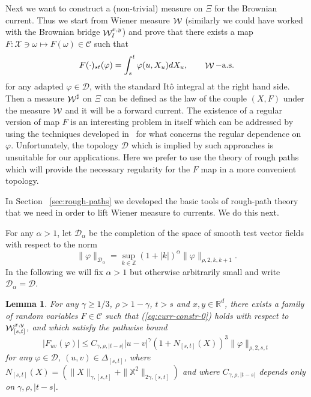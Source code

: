 \documentclass[a4paper,11pt]{article}
\newtheorem{lemma}[theorem]{Lemma}
\newcommand{\R}{\mathbb{R}}
\newcommand {\C}  {\ensuremath {\mathcal{C}}}
\newcommand {\D}  {\ensuremath {\mathcal{D}}}
\newcommand{\W}{\mathop{\mathrm{{\cal W}}}\nolimits}
\newcommand{\X}{\mathcal{X}}
\newcommand {\Z} {\mathbb{Z}}
\begin{document}
Next we want to construct a (non-trivial) measure on $\Xi$ for the
Brownian current. Thus we start from Wiener measure $\W$ (similarly 
we could have worked with the Brownian bridge $\W_I^{x,y}$) and prove 
that there exists a map $F: \X \ni \omega \mapsto F(\omega)\in\C$ such
 that
\begin{equation}
  \label{eq:curr-constr-0-bis}
F(\cdot)_{st}(\varphi) = \int_s^t \varphi(u,X_u) dX_u, 
\qquad \W-\text{a.s.}  
\end{equation}
for any adapted $\varphi \in \D$, with the standard It\^o integral 
at the right hand side. Then a measure $\W^\sharp$ on $\Xi$ can be 
defined as the law of the couple $(X,F)$ under the measure $\W$ and 
it will be a forward current. The existence of a regular version of 
map $F$ is an interesting problem in itself which can be addressed 
by using the techniques developed in~\cite{FGGT, FGR} for what 
concerns the regular dependence on $\varphi$. Unfortunately, the 
topology $\D$ which is implied by such approaches is unsuitable for 
our applications. Here we prefer to use the theory of rough paths 
which will provide the necessary regularity for the $F$ map in a 
more convenient topology.

In Section ~\ref{sec:rough-paths} we developed the basic tools of
rough-path theory that we need in order to lift Wiener measure to 
currents. We do this next.

For any $\alpha > 1$, let $\D_\alpha$ be the completion of the space of 
smooth test vector fields with respect to the norm
$$
\|\varphi\|_{\D_\alpha} = \sup_{k \in \Z} (1+|k|)^\alpha 
\|\varphi\|_{\rho,2,k,k+1}.
$$ 
In the following we will fix $\alpha>1$ but otherwise arbitrarily small and 
write $\D_\alpha = \D$.
\begin{lemma}
\label{lemma:rough}
For any $\gamma \ge 1/3$, $\rho > 1-\gamma$, $t>s$ and $x,y\in \R^d$, 
there exists a family of random variables $F \in \C$ such that
(\ref{eq:curr-constr-0}) holds with respect to $\W_{[s,t]}^{x,y}$, 
and which satisfy the pathwise bound
\begin{equation}
  \label{eq:F-bound}
 |F_{uv}(\varphi)| \le C_{\gamma,\rho,|t-s|} |u-v|^\gamma (1+N_{[s,t]}(X))^3 
 \|\varphi\|_{\rho,2,s,t}
\end{equation}
for any $\varphi \in \D$, $(u,v) \in \Delta_{[s,t]}$, where
$N_{[s,t]}(X) = (\|X\|_{\gamma,[s,t]} + 
\|\mathbb{X}^2\|_{2\gamma,[s,t]})$ and where
$C_{\gamma,\rho,|t-s|}$ depends only on $\gamma,\rho,|t-s|$.
\end{lemma}
\end{document}
